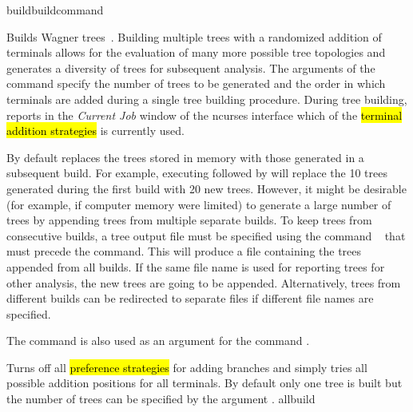 \begin{command}{build}{buildcommand}

	
 	\begin{poydescription}
        Builds Wagner trees~\cite{farris1970}. Building multiple trees with a randomized addition 
        of terminals allows for the evaluation of many more possible tree topologies and generates 
        a diversity of trees for subsequent analysis. 
        The arguments of the command  specify the number of trees to be generated and
        the order in which terminals are added during a single tree building procedure. During tree
        building, \poy reports in the \emph{Current Job} window of the ncurses interface
        which of the \hl{terminal addition strategies} is currently used.
        
        By default \poy replaces the trees stored in memory with those generated
        in a subsequent build. For example, executing 
        followed by  will replace the 10 trees generated
        during the first build with 20 new trees. However, it might be desirable
        (for example, if computer memory were limited) to generate a large number of trees by
        appending trees from multiple separate builds. To keep trees from consecutive
        builds, a tree output file must be specified using the command ~ that must 
        precede the  command. This will produce a file
        containing the trees appended from all builds. If the same file name is used for reporting
         trees for other analysis, the new trees are going to be appended. Alternatively, trees from different
        builds can be redirected to separate files if different file names are specified.
        
        The command  is also used as
        an argument for the command .
   	\end{poydescription}

	\begin{arguments}

            {Turns off all \hl{preference strategies} for adding branches
            and simply tries all possible addition positions for
            all terminals.  By default only one tree is built but
            the number of  trees can be specified by the argument .}
            {allbuild}


\end{arguments}
\end{command}

